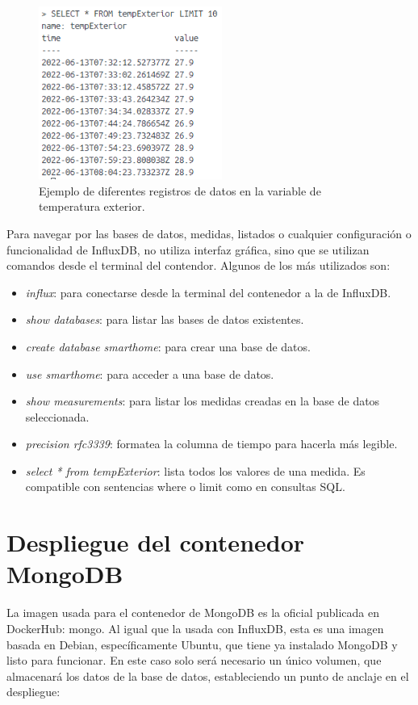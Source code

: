 \begin{figure}[h]
    \centering
    \includegraphics[width=6cm]{imagenes/capitulo4/ejemploConsultaInfluxDB.png}
    \caption{Ejemplo de diferentes registros de datos en la variable de temperatura exterior.}
    \label{fig:ejemplo_influxdb}
\end{figure}

Para navegar por las bases de datos, medidas, listados o cualquier configuración o funcionalidad de InfluxDB, no utiliza interfaz gráfica, sino que se utilizan comandos desde el terminal del contendor\cite{cap4_2}. Algunos de los más utilizados son:

\begin{itemize}
    \item \textit{influx}: para conectarse desde la terminal del contenedor a la de InfluxDB.
    \item \textit{show databases}: para listar las bases de datos existentes.
    \item \textit{create database smarthome}: para crear una base de datos.
    \item \textit{use smarthome}: para acceder a una base de datos.
    \item \textit{show measurements}: para listar los medidas creadas en la base de datos seleccionada.
    \item \textit{precision rfc3339}: formatea la columna de tiempo para hacerla más legible.
    \item \textit{select * from tempExterior}: lista todos los valores de una medida. Es compatible con sentencias where o limit como en consultas SQL.
\end{itemize}

\section{Despliegue del contenedor MongoDB}

La imagen usada para el contenedor de MongoDB es la oficial publicada en DockerHub: mongo\cite{cap4_3}. Al igual que la usada con InfluxDB, esta es una imagen basada en Debian, específicamente Ubuntu, que tiene ya instalado MongoDB y listo para funcionar. En este caso solo será necesario un único volumen, que almacenará los datos de la base de datos, estableciendo un punto de anclaje en el despliegue:

